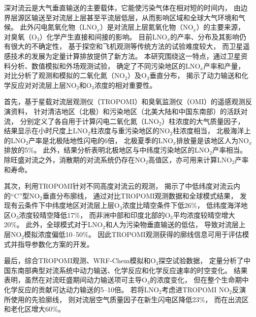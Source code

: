 
\abstract
{
深对流云是大气垂直输送的主要载体，它能使污染气体在相对短的时间内，
由边界层源区输送至对流层上层甚至平流层低层，从而影响区域和全球大气环境和气候。
此外闪电氮氧化物（LNO$_x$）是对流层上层氮氧化物（NO$_x$）的主要来源，
对臭氧（O$_3$）化学产生直接和间接的影响。
目前LNO$_x$的产率、分布及其影响仍有很大的不确定性，
基于探空和飞机观测等传统方法的试验难度较大，
而卫星遥感技术的发展为定量计算排放提供了新方法。
本研究围绕这一特点，通过卫星资料分析、数值模拟和外场观测试验，
确定了不同污染地区的LNO$_x$产率和产量，
对比分析了观测和模拟的二氧化氮（NO$_2$）及O$_3$垂直分布，
揭示了动力输送和化学反应对对流层上层NO$_2$和O$_3$浓度的相对重要性。

首先，基于星载对流层观测仪（TROPOMI）和臭氧监测仪（OMI）的遥感观测反演资料，
针对清洁地区（北极）和污染地区（北美大陆和中国东南部）的活跃对流，
分别定义了各自用于计算闪电二氧化氮（LNO$_2$）柱浓度的大气质量因子，
结果显示在小时尺度上LNO$_2$柱浓度与重污染地区的NO$_2$柱浓度相当，
北极海洋上的LNO$_2$产率是北极陆地性闪电的6倍，
北极夏季的LNO$_x$排放量是该地区人为NO$_x$排放的5\%。
此外，结果分析表明北极地区与中纬度污染地区的LNO$_2$产率相当。
除旺盛对流之外，消散期的对流系统仍存在NO$_2$高值区，亦可用来计算LNO$_2$产率和寿命。

其次，利用TROPOMI针对不同高度对流云的观测，
揭示了中低纬度对流云内的“C”型NO$_2$垂直分布廓线，
通过对比TROPOMI观测数据和全球模式结果，
发现有云条件下中纬度地区对流层上层O$_3$浓度比晴空条件下低26\%，
低纬度海洋地区O$_3$浓度较晴空降低17\%，
而非洲中部和印度北部的O$_3$平均浓度较晴空增大20\%。
此外，全球模式对于LNO$_2$和人为污染物垂直输送的低估，
导致对流层上层NO$_2$模拟浓度偏低10--50\%。
因此TROPOMI观测获得的廓线信息可用于评估模式并指导参数化方案的开发。

最后，综合TROPOMI观测、WRF-Chem模拟和O$_3$探空试验数据，
定量分析了中国东南部典型对流系统中动力输送、化学反应和化学反应速率的时空变化。
结果表明，虽然在对流旺盛期间动力输送项可主导O$_3$的浓度变化，
但在整个生命期中化学反应的贡献可达动力输送的5--10倍。
若将LNO$_2$考虑进TROPOMI NO$_2$反演所使用的先验廓线，
则对流层空气质量因子在新生闪电区降低23\%，
而在出流区和老化区增大60\%。
}
